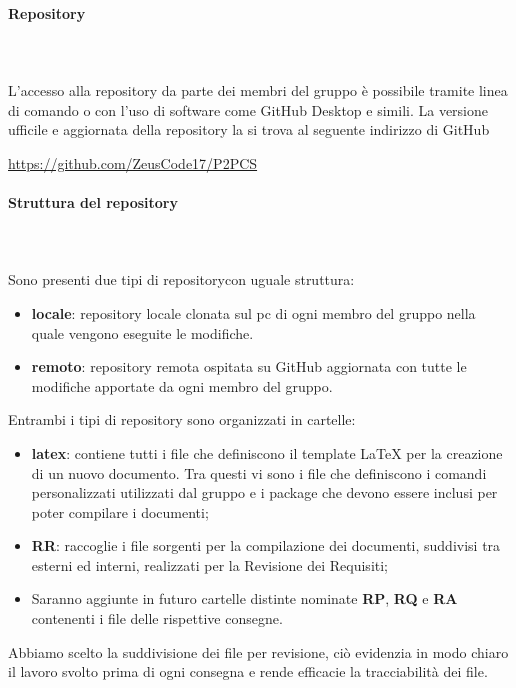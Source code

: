 	\paragraph{Repository} \mbox{}\\ \mbox{}\\
	L'accesso alla repository da parte dei membri del gruppo è possibile tramite linea di comando o con l'uso di software come GitHub Desktop e simili.
	La versione ufficile e aggiornata della repository la si trova al seguente indirizzo di GitHub \newline \newline
	\centerline{\url{https://github.com/ZeusCode17/P2PCS}}
	\paragraph{Struttura del repository} \mbox{}\\ \mbox{}\\
	Sono presenti due tipi di repository\glosp con uguale struttura:
	\begin{itemize}
		\item \textbf{locale}: repository locale clonata sul pc di ogni membro del gruppo nella quale vengono eseguite le modifiche.
		\item \textbf{remoto}: repository remota ospitata su GitHub aggiornata con tutte le modifiche apportate da ogni membro del gruppo.
	\end{itemize}			
	Entrambi i tipi di repository sono organizzati in cartelle:
	\begin{itemize}
		\item \textbf{latex}: contiene tutti i file che definiscono il template \LaTeX{} per la creazione di un nuovo documento. Tra questi vi sono i file che definiscono i comandi personalizzati utilizzati dal gruppo e i package che devono essere inclusi per poter compilare i documenti;
		\item \textbf{RR}: raccoglie i file sorgenti per la compilazione dei documenti, suddivisi tra esterni ed interni, realizzati per la Revisione dei Requisiti;
		\item Saranno aggiunte in futuro cartelle distinte nominate \textbf{RP}, \textbf{RQ} e \textbf{RA} contenenti i file delle rispettive consegne.
	\end{itemize}
	Abbiamo scelto la suddivisione dei file per revisione, ciò evidenzia in modo chiaro il lavoro svolto prima di ogni consegna e rende efficacie la tracciabilità dei file.
